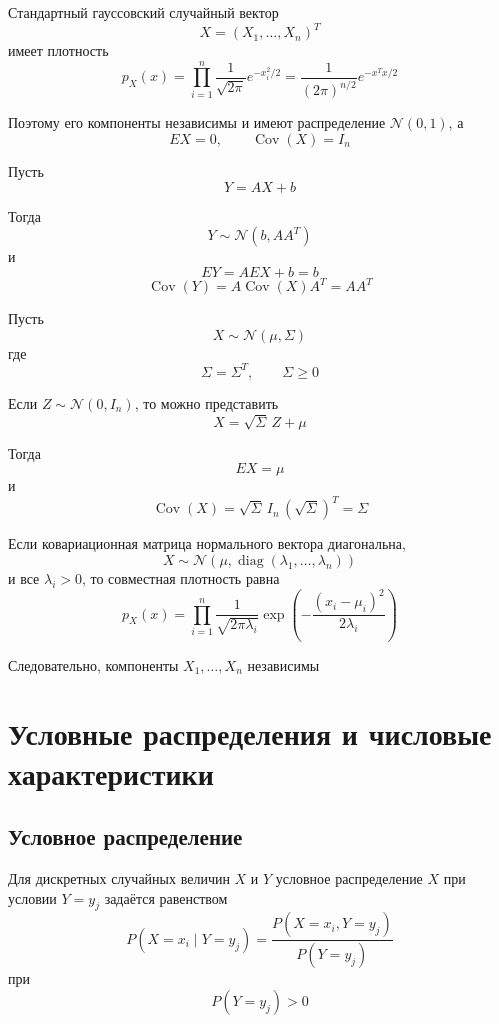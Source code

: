 \documentclass[12pt,a4paper]{article}
\begin{document}
\begin{example}

Стандартный гауссовский случайный вектор
\[
X=(X_1,\ldots,X_n)^T
\]
имеет плотность
\[
p_X(x)
=
\prod_{i=1}^n
\frac{1}{\sqrt{2\pi}}e^{-x_i^2/2}
=
\frac{1}{(2\pi)^{n/2}}e^{-x^Tx/2}
\]

Поэтому его компоненты независимы и имеют распределение $\mathcal{N}(0,1)$, а
\[
EX=0,
\qquad
\operatorname{Cov}(X)=I_n
\]

\medskip

Пусть
\[
Y=AX+b
\]

Тогда
\[
Y\sim\mathcal{N}(b,AA^T)
\]
и
\[
EY=AEX+b=b
\]
\[
\operatorname{Cov}(Y)
=
A\operatorname{Cov}(X)A^T
=
AA^T
\]

\medskip

Пусть
\[
X\sim\mathcal{N}(\mu,\Sigma)
\]
где
\[
\Sigma=\Sigma^T,
\qquad
\Sigma\geq0
\]

Если $Z\sim\mathcal{N}(0,I_n)$, то можно представить
\[
X=\sqrt{\Sigma}\,Z+\mu
\]

Тогда
\[
EX=\mu
\]
и
\[
\operatorname{Cov}(X)
=
\sqrt{\Sigma}\,I_n\,(\sqrt{\Sigma})^T
=
\Sigma
\]

\medskip

Если ковариационная матрица нормального вектора диагональна,
\[
X\sim
\mathcal{N}
\left(
\mu,
\operatorname{diag}(\lambda_1,\ldots,\lambda_n)
\right)
\]
и все $\lambda_i>0$, то совместная плотность равна
\[
p_X(x)
=
\prod_{i=1}^n
\frac{1}{\sqrt{2\pi\lambda_i}}
\exp\left(
-\frac{(x_i-\mu_i)^2}{2\lambda_i}
\right)
\]

Следовательно, компоненты $X_1,\ldots,X_n$ независимы

\end{example}

\newpage

\section{Условные распределения и числовые характеристики}

\subsection{Условное распределение}

\begin{definition}

Для дискретных случайных величин $X$ и $Y$ условное распределение $X$ при условии $Y=y_j$ задаётся равенством
\[
P(X=x_i\mid Y=y_j)
=
\frac{P(X=x_i,Y=y_j)}
{P(Y=y_j)}
\]
при
\[
P(Y=y_j)>0
\]

\end{definition}
\end{document}
